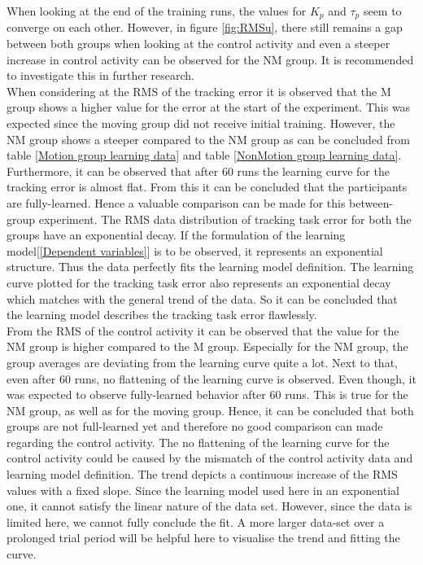 \documentclass[conference]{IEEEtran}
\begin{document}
When looking at the end of the training runs, the values for $K_p$ and $\tau_p$ seem to converge on each other. However, in figure \ref{fig:RMSu}, there still remains a gap between both groups when looking at the control activity and even a steeper increase in control activity can be observed for the NM group. It is recommended to investigate this in further research. \\

When considering at the RMS of the tracking error it is observed that the M group shows a higher value for the error at the start of the experiment. This was expected since the moving group did not receive initial training. However, the NM group shows a steeper compared to the NM group as can be concluded from table \ref{Motion group learning data} and table \ref{NonMotion group learning data}. Furthermore, it can be observed that after 60 runs the learning curve for the tracking error is almost flat. From this it can be concluded that the participants are fully-learned. Hence a valuable comparison can be made for this between-group experiment. The  RMS data distribution of tracking task error for both the groups have an exponential decay. If the formulation of the learning model[\ref{Dependent variables}] is to be observed, it represents an exponential structure. Thus the data perfectly fits the learning model definition. The learning curve plotted for the tracking task error also represents an exponential decay which matches with the general trend of the data. So it can be concluded that the learning model describes the tracking task error flawlessly.\\

From the RMS of the control activity it can be observed that the value for the NM group is higher compared to the M group. Especially for the NM group, the group averages are deviating from the learning curve quite a lot.  Next to that, even after 60 runs, no flattening of the learning curve is observed. Even though, it was expected to observe fully-learned behavior after 60 runs. This is true for the NM group, as well as for the moving group. Hence, it can be concluded that both groups are not full-learned yet and therefore no good comparison can made regarding the control activity. The no flattening of the learning curve for the control activity could be caused by the mismatch of the control activity data and learning model definition. The trend depicts a continuous increase of the RMS values with a fixed slope. Since the learning model used here in an exponential one, it cannot satisfy the linear nature of the data set. However, since the data is limited here, we cannot fully conclude the fit. A more larger data-set over a prolonged trial period will be helpful here to visualise the trend and fitting the curve. \\
\end{document}
